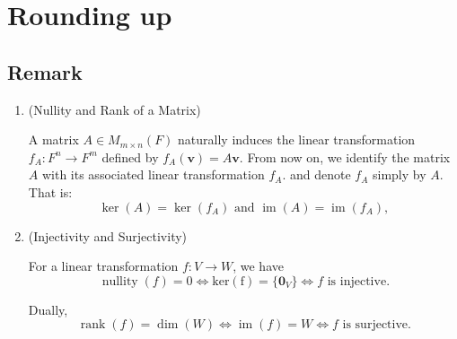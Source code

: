 \documentclass[12pt]{article}
\begin{document}
\newpage

\section{Rounding up}

\subsection{Remark}

\begin{enumerate}

\item (Nullity and Rank of a Matrix)

A matrix $A\in M_{m\times n}(F)$ naturally induces the linear transformation $f_A:F^n\rightarrow F^m$ defined by
$f_A(\mathbf{v})=A\mathbf{v}$. From now on, we identify the matrix $A$ with its associated linear transformation $f_A$.
and denote $f_A$ simply by $A$. That is: 
\[
\operatorname{ker}(A)=\operatorname{ker}(f_A) \text{ and } \operatorname{im}(A)=\operatorname{im}(f_A),
\]

\item (Injectivity and Surjectivity)

For a linear transformation $f:V\rightarrow W$, we have
\[
\operatorname{nullity}(f)=0
\iff
\operatorname{ker(f)}=\{\mathbf{0}_V\}
\iff
f\text{ is injective}.
\]

Dually,
\[
\operatorname{rank}(f)=\operatorname{dim}(W)
\iff
\operatorname{im}(f)=W
\iff
f\text{ is surjective}.
\]

\end{enumerate}
\end{document}
